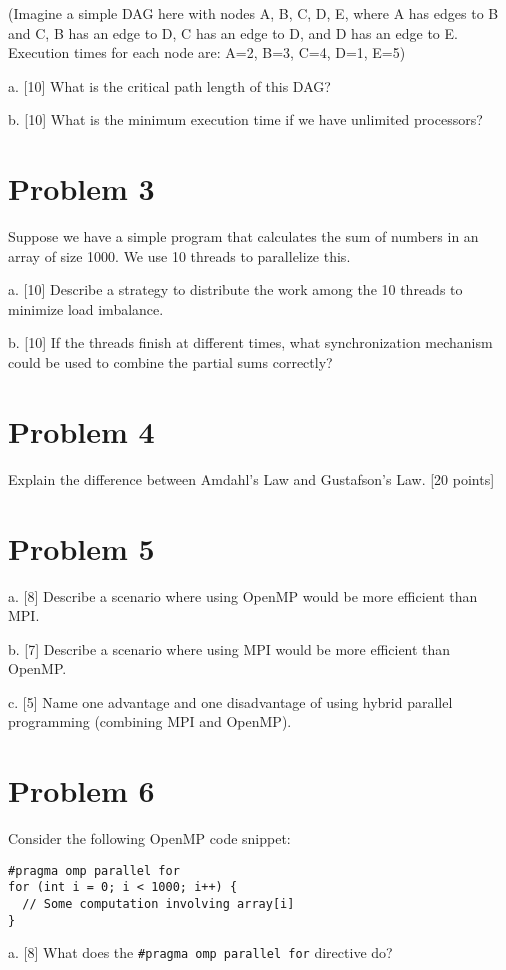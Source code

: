 \documentclass{article}
\begin{document}
(Imagine a simple DAG here with nodes A, B, C, D, E, where A has edges to B and C, B has an edge to D, C has an edge to D, and D has an edge to E.  Execution times for each node are: A=2, B=3, C=4, D=1, E=5)

a. [10] What is the critical path length of this DAG?

b. [10] What is the minimum execution time if we have unlimited processors?

\section*{Problem 3}
Suppose we have a simple program that calculates the sum of numbers in an array of size 1000.  We use 10 threads to parallelize this.

a. [10] Describe a strategy to distribute the work among the 10 threads to minimize load imbalance.

b. [10]  If the threads finish at different times, what synchronization mechanism could be used to combine the partial sums correctly?

\section*{Problem 4}
Explain the difference between Amdahl's Law and Gustafson's Law.  [20 points]


\section*{Problem 5}
a. [8] Describe a scenario where using OpenMP would be more efficient than MPI.

b. [7] Describe a scenario where using MPI would be more efficient than OpenMP.

c. [5] Name one advantage and one disadvantage of using hybrid parallel programming (combining MPI and OpenMP).


\section*{Problem 6}
Consider the following OpenMP code snippet:

\begin{verbatim}
#pragma omp parallel for
for (int i = 0; i < 1000; i++) {
  // Some computation involving array[i]
}
\end{verbatim}

a. [8] What does the \texttt{\#pragma omp parallel for} directive do?
\end{document}
